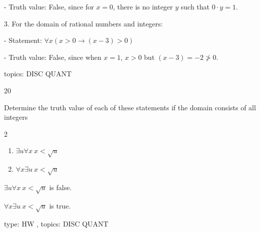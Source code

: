 \documentclass[12pt]{article}
\begin{document}
\begin{enumerate}
{- Truth value: False, since for $x = 0$, there is no integer $y$ such that $0 \cdot y = 1$.

3. For the domain of rational numbers and integers:

- Statement: $\forall x (x > 0 \rightarrow (x - 3) > 0 )$

- Truth value: False, since when $x = 1$, $x > 0$ but $(x - 3) = -2 \not> 0$.
}{}{topics: DISC QUANT}


 \ex
{}{20}
{  Determine the truth value of each of these statements if
the domain consists of all integers

\begin{multicols}{2} 
\begin{enumerate}


\item $\exists u \forall x \  x < \sqrt{u}$

\item $\forall x \exists u  \   x < \sqrt{u} $


\end{enumerate}
\end{multicols} 

}{

 

$\exists u \forall x \  x < \sqrt{u}$ is false.

$\forall x \exists u \  x < \sqrt{u}$ is true.
}{}{type: HW , topics: DISC QUANT}





\end{enumerate} 
\end{document}

